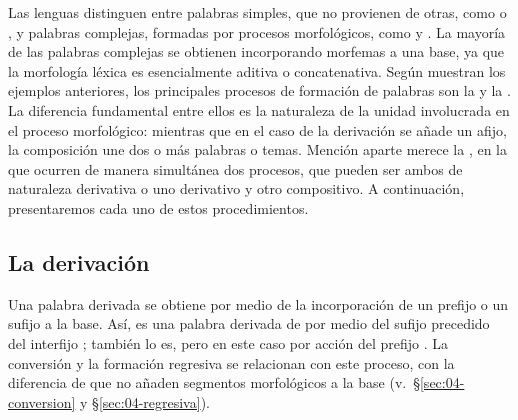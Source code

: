 Las lenguas distinguen entre palabras simples, que no provienen de otras, como
 o , y palabras complejas, formadas por procesos
morfológicos, como  y . La mayoría de las
palabras complejas se obtienen incorporando morfemas a una base, ya que la
morfología léxica es esencialmente aditiva o concatenativa. Según muestran los
ejemplos anteriores, los principales procesos de formación de palabras son la
 y la . La diferencia fundamental entre
ellos es la naturaleza de la unidad involucrada en el proceso morfológico:
mientras que en el caso de la derivación se añade un afijo, la composición une
dos o más palabras o temas. Mención aparte merece la , en
la que ocurren de manera simultánea dos procesos, que pueden ser ambos de
naturaleza derivativa o uno derivativo y otro compositivo. A continuación,
presentaremos cada uno de estos procedimientos.

\subsection{La derivación}\label{sec:04-derivacion}

Una palabra derivada se obtiene por medio de la incorporación de un prefijo o un
sufijo a la base. Así,  es una palabra derivada de
 por medio del sufijo  precedido del interfijo
;  también lo es, pero en este caso por acción del
prefijo . La conversión y la formación regresiva se relacionan con
este proceso, con la diferencia de que no añaden segmentos morfológicos a la
base (v.~§\ref{sec:04-conversion} y §\ref{sec:04-regresiva}).

